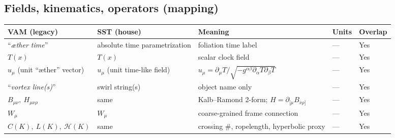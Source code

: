 \documentclass[11pt]{article}
\begin{document}
	\subsection*{Fields, kinematics, operators (mapping)}
			\begin{center}
				\scriptsize
				\begin{tabular}{lllll}
					\hline
					\textbf{VAM (legacy)} & \textbf{SST (house)} & \textbf{Meaning} & \textbf{Units} & \textbf{Overlap} \\
					\hline
					``\textit{æther time}'' & absolute time parametrization & foliation time label & — & Yes \\
					$T(x)$ & $T(x)$ & scalar clock field & — & Yes \\
					$u_\mu$ (unit ``æther'' vector) & $u_\mu$ (unit time-like field) & $u_\mu=\partial_\mu T/\sqrt{-g^{\alpha\beta}\partial_\alpha T\partial_\beta T}$ & — & Yes \\
					``\textit{vortex line(s)}'' & swirl string(s) & object name only & — & Yes \\
					$B_{\mu\nu},\ H_{\mu\nu\rho}$ & same & Kalb--Ramond 2-form; $H=\partial_{[\mu}B_{\nu\rho]}$ & — & Yes \\
					$W_\mu$ & $W_\mu$ & coarse-grained frame connection & — & Yes \\
					$C(K),\ L(K),\ \mathcal H(K)$ & same & crossing \#, ropelength, hyperbolic proxy & — & Yes \\
					\hline
				\end{tabular}
			\end{center}
\end{document}
